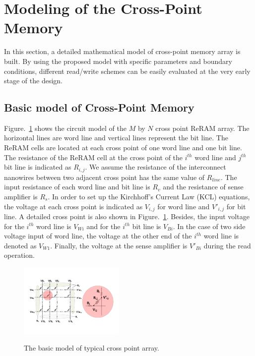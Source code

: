 \vspace{10pt}
\section{Modeling of the Cross-Point Memory}\label{sec:model}

In this section, a detailed mathematical model of cross-point memory array is built. By using the proposed model with specific parameters and
boundary conditions, different read/write schemes can be easily evaluated
at the very early stage of the design.

\subsection{Basic model of Cross-Point Memory}
Figure.~\ref{fig:modeling} shows the circuit model of the $M$ by $N$ cross point ReRAM array. The horizontal lines are word line and vertical lines represent the bit line. The ReRAM cells are located at each cross point of one word line and one bit line. The resistance of the ReRAM cell at the cross point of the $i^{th}$ word line and $j^{th}$ bit line is indicated as $R_{i,j}$. We assume the resistance of the interconnect nanowires between two adjacent cross point has the same value of $R_{line}$. The input resistance of each word line and bit line is $R_v$ and the resistance of sense amplifier is $R_s$. In order to set up the Kirchhoff's Current Law (KCL) equations, the voltage at each cross point is indicated as $V_{i,j}$ for word line and $V'_{i,j}$ for bit line. A detailed cross point is also shown in Figure.~\ref{fig:modeling}. Besides, the input voltage for the $i^{th}$ word line is $V_{Wi}$ and for the $i^{th}$ bit line is $V_{Bi}$. In the case of two side voltage input of word line, the voltage at the other end of the $i^{th}$ word line is denoted as $V_{W1}$. Finally, the voltage at the sense amplifier is $V'_{Bi}$ during the read operation.

\begin{figure}[!b]
\centering
  \includegraphics[width=0.45\textwidth]{./figures/model.pdf}\\
  \caption{The basic model of typical cross point array.}\label{fig:modeling}
\end{figure}
